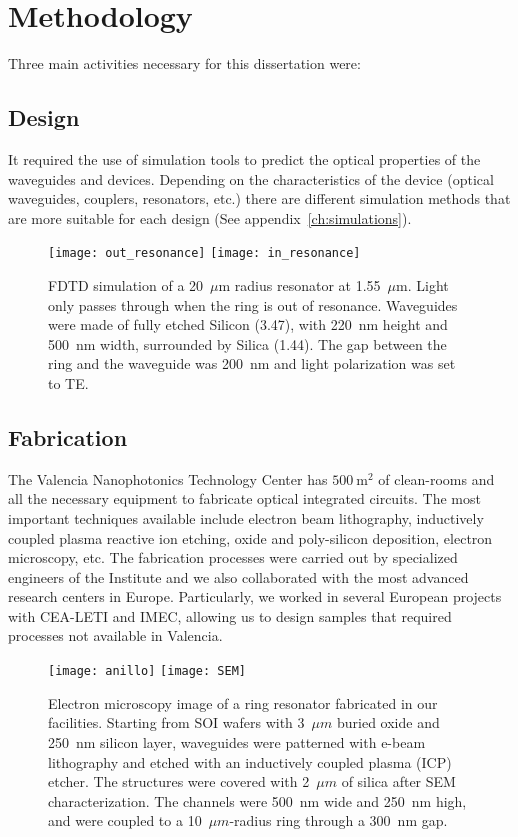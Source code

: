 \section{Methodology}
\label{ch:methodology}
Three main activities necessary for this dissertation were:

\subsection{Design}
It required the use of simulation tools to predict the optical properties of the waveguides and devices. Depending on the characteristics of the device (optical waveguides, couplers, resonators, etc.) there are different simulation methods that are more suitable for each design (See appendix~\ref{ch:simulations}).

\begin{figure}[htb]
  \centering
  \texttt{[image: out\_resonance]}              
  \texttt{[image: in\_resonance]}
  \caption{FDTD simulation of a 20~$\mu$m radius resonator at 1.55~$\mu$m. Light only passes through when the ring is out of resonance. Waveguides were made of fully etched Silicon (3.47), with 220~nm height and 500~nm width, surrounded by Silica (1.44). The gap between the ring and the waveguide was 200~nm and light polarization was set to TE.
  }
\end{figure}

\subsection{Fabrication}
The Valencia Nanophotonics Technology Center has $ 500~\mathrm{m}^2 $ of clean-rooms and all the necessary equipment to fabricate optical integrated circuits. The most important techniques available include electron beam lithography, inductively coupled plasma reactive ion etching, oxide and poly-silicon deposition, electron microscopy, etc.
The fabrication processes were carried out by specialized engineers of the Institute and we also collaborated with the most advanced research centers in Europe. Particularly, we worked in several European projects with CEA-LETI and IMEC, allowing us to design samples that required processes not available in Valencia.

\begin{figure}[htb]
  \centering
  \texttt{[image: anillo]}              
  \texttt{[image: SEM]}
  \caption{Electron microscopy image of a ring resonator fabricated in our facilities. Starting from SOI wafers with 3~$\mu m$ buried oxide and 250~nm silicon layer, waveguides were patterned with e-beam lithography and etched with an inductively coupled plasma (ICP) etcher. The structures were covered with 2~$\mu m$ of silica after SEM characterization. The channels were 500~nm wide and 250~nm high, and were coupled to a 10~$\mu m$-radius ring through a 300~nm gap.
  }

\end{figure}



